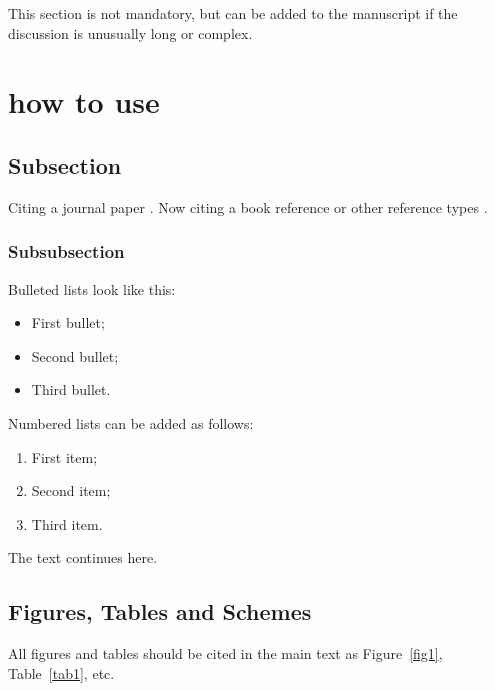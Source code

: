 \begin{paracol}{2}
This section is not mandatory, but can be added to the manuscript if the discussion is unusually long or complex.

\section{how to use}

\subsection{Subsection}
Citing a journal paper \cite{wagner2017optimization} . Now citing a book reference \cite{blair2005sam} or other reference types \cite{hirsch2011standardization}. \cite{nellis_klein_2008}
\subsubsection{Subsubsection}

Bulleted lists look like this:
\begin{itemize}
\item	First bullet;
\item	Second bullet;
\item	Third bullet.
\end{itemize}

Numbered lists can be added as follows:
\begin{enumerate}
\item	First item; 
\item	Second item;
\item	Third item.
\end{enumerate}

The text continues here. 

\subsection{Figures, Tables and Schemes}

All figures and tables should be cited in the main text as Figure~\ref{fig1}, Table~\ref{tab1}, etc.


\end{paracol}
